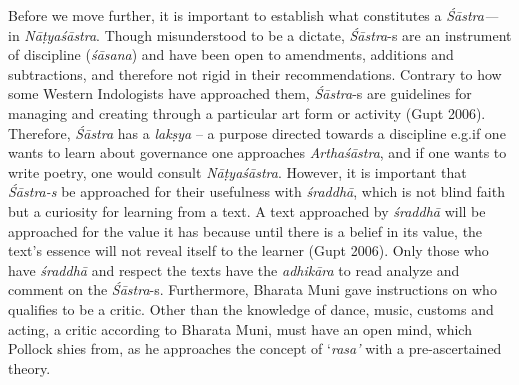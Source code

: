 Before we move further, it is important to establish what constitutes a \textsl{Śāstra---} in \textsl{Nāṭyaśāstra}. Though misunderstood to be a dictate, \hbox{\textsl{Śāstra}-s} are an instrument of discipline (\textsl{śāsana}) and have been open to amendments, additions and subtractions, and therefore not rigid in their recommendations. Contrary to how some Western Indologists have approached them, \textsl{Śāstra}-s are guidelines for managing and creating through a particular art form or activity (Gupt 2006). Therefore, \textsl{Śāstra} has a \textsl{lakṣya} -- a purpose directed towards a discipline e.g.\@ if one wants to learn about governance one approaches \textsl{Arthaśāstra}, and if one wants to write poetry, one would consult \textsl{Nāṭyaśāstra}. However, it is important that \textsl{Śāstra-s} be approached for their usefulness with \textsl{śraddhā}, which is not blind faith but a curiosity for learning from a text. A text approached by \textsl{śraddhā} will be approached for the value it has because until there is a belief in its value, the text’s essence will not reveal itself to the learner (Gupt 2006).  Only those who have \textsl{śraddhā} and respect the texts have the \textsl{adhikāra} to read analyze and comment on the \hbox{\textsl{Śāstra}-s}. Furthermore, Bharata Muni gave instructions on who qualifies to be a critic. Other than the knowledge of dance, music, customs and acting, a critic according to Bharata Muni, must have an open mind, which Pollock shies from, as he approaches the concept of ‘\textsl{rasa’} with a pre-ascertained theory.

\newpage

